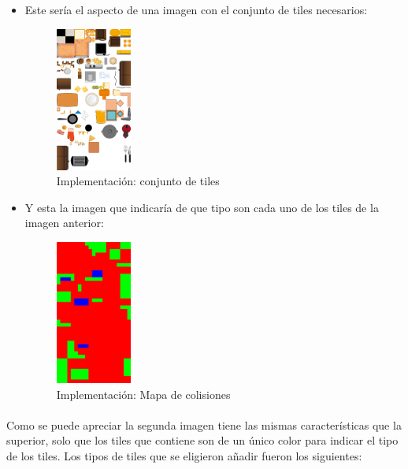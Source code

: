 \begin{itemize}

    \item Este sería el aspecto de una imagen con el conjunto de tiles necesarios:
    \begin{figure}[H]
      \label{tileset}
      \begin{center}
        \includegraphics[scale=1.45]{imagenes/tileset.png}
      \end{center}
      \caption{Implementación: conjunto de tiles}
    \end{figure}
    
    \item Y esta la imagen que indicaría de que tipo son cada uno de los tiles de la imagen anterior:
    \begin{figure}[H]
      \label{collisionmap}
      \begin{center}
        \includegraphics[scale=1.45]{imagenes/collisionmap.png}
      \end{center}
      \caption{Implementación: Mapa de colisiones}
    \end{figure}
    
\end{itemize}

\paragraph{}
Como se puede apreciar la segunda imagen tiene las mismas características que la superior, solo que los tiles que contiene
son de un único color para indicar el tipo de los tiles. Los tipos de tiles que se eligieron añadir fueron los siguientes:

